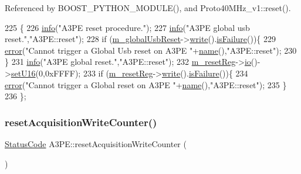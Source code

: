 Referenced by B\+O\+O\+S\+T\+\_\+\+P\+Y\+T\+H\+O\+N\+\_\+\+M\+O\+D\+U\+L\+E(), and Proto40\+M\+Hz\+\_\+v1\+::reset().


\begin{DoxyCode}
225                \{
226         \hyperlink{classObject_a644fd329ea4cb85f54fa6846484b84a8}{info}(\textcolor{stringliteral}{"A3PE reset procedure."});
227     \hyperlink{classObject_a644fd329ea4cb85f54fa6846484b84a8}{info}(\textcolor{stringliteral}{"A3PE global usb reset."},\textcolor{stringliteral}{"A3PE::reset"});
228     \textcolor{keywordflow}{if} (\hyperlink{classA3PE_abd71e0c273f9e211e1a9302019129aff}{m\_globalUsbReset}->\hyperlink{classIOobject_a9f6984bc9f0fadcf800f1be2523ac744}{write}().\hyperlink{classStatusCode_a5dd22dc6eb2c52fc4cabc58f6dea2eb7}{isFailure}())\{
229       \hyperlink{classObject_a204a95f57818c0f811933917a30eff45}{error}(\textcolor{stringliteral}{"Cannot trigger a Global Usb reset on A3PE "}+\hyperlink{classObject_a300f4c05dd468c7bb8b3c968868443c1}{name}(),\textcolor{stringliteral}{"A3PE::reset"});
230     \}
231     \hyperlink{classObject_a644fd329ea4cb85f54fa6846484b84a8}{info}(\textcolor{stringliteral}{"A3PE global reset."},\textcolor{stringliteral}{"A3PE::reset"});
232         \hyperlink{classA3PE_ab4db5f00976e5095686f108c8febf702}{m\_resetReg}->\hyperlink{classIOobject_af04fb94137c3d86849f478ac5afab5d1}{io}()->\hyperlink{classIOdata_aa9ade5ce3944c8e2b831533b6f876caf}{setU16}(0,0xFFFF);
233     \textcolor{keywordflow}{if} (\hyperlink{classA3PE_ab4db5f00976e5095686f108c8febf702}{m\_resetReg}->\hyperlink{classIOobject_a9f6984bc9f0fadcf800f1be2523ac744}{write}().\hyperlink{classStatusCode_a5dd22dc6eb2c52fc4cabc58f6dea2eb7}{isFailure}())\{
234       \hyperlink{classObject_a204a95f57818c0f811933917a30eff45}{error}(\textcolor{stringliteral}{"Cannot trigger a Global reset on A3PE "}+\hyperlink{classObject_a300f4c05dd468c7bb8b3c968868443c1}{name}(),\textcolor{stringliteral}{"A3PE::reset"});
235     \}
236   \};
\end{DoxyCode}
\mbox{\label{classA3PE_a557ea9cfa97a03db1514af2fe8936df3}} 
\subsubsection{\texorpdfstring{reset\+Acquisition\+Write\+Counter()}{resetAcquisitionWriteCounter()}}
{\footnotesize\ttfamily \hyperlink{classStatusCode}{Status\+Code} A3\+P\+E\+::reset\+Acquisition\+Write\+Counter (\begin{DoxyParamCaption}{ }\end{DoxyParamCaption})}




